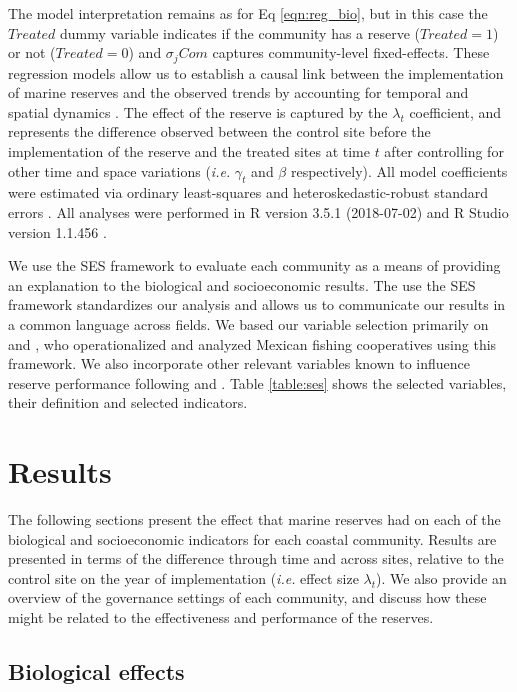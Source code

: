 \documentclass{frontiersSCNS}
\theoremstyle{definition}
\theoremstyle{definition}
\theoremstyle{definition}
\theoremstyle{remark}
\begin{document}
The model interpretation remains as for Eq \ref{eqn:reg_bio}, but in
this case the \(Treated\) dummy variable indicates if the community has
a reserve (\(Treated = 1\)) or not (\(Treated = 0\)) and \(\sigma_jCom\)
captures community-level fixed-effects. These regression models allow us
to establish a causal link between the implementation of marine reserves
and the observed trends by accounting for temporal and spatial dynamics
\citep{depalma_2018}. The effect of the reserve is captured by the
\(\lambda_t\) coefficient, and represents the difference observed
between the control site before the implementation of the reserve and
the treated sites at time \(t\) after controlling for other time and
space variations (\emph{i.e.} \(\gamma_t\) and \(\beta\) respectively).
All model coefficients were estimated via ordinary least-squares and
heteroskedastic-robust standard errors \citep{zeileis_2004-7n}. All
analyses were performed in R version 3.5.1 (2018-07-02) and R Studio
version 1.1.456 \citep{R_2018}.

We use the SES framework to evaluate each community as a means of
providing an explanation to the biological and socioeconomic results.
The use the SES framework standardizes our analysis and allows us to
communicate our results in a common language across fields. We based our
variable selection primarily on \citet{leslie_2015-na} and
\citet{basurto_2013-oq}, who operationalized and analyzed Mexican
fishing cooperatives using this framework. We also incorporate other
relevant variables known to influence reserve performance following
\citet{difranco_2016-Xw} and \citet{edgar_2014-UO}. Table
\ref{table:ses} shows the selected variables, their definition and
selected indicators.

\section{Results}\label{results}

The following sections present the effect that marine reserves had on
each of the biological and socioeconomic indicators for each coastal
community. Results are presented in terms of the difference through time
and across sites, relative to the control site on the year of
implementation (\emph{i.e.} effect size \(\lambda_t\)). We also provide
an overview of the governance settings of each community, and discuss
how these might be related to the effectiveness and performance of the
reserves.

\subsection{Biological effects}\label{biological-effects}
\end{document}
